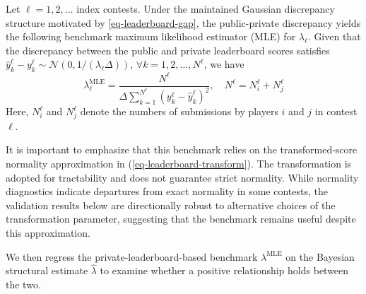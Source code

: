 \documentclass[mnsc]{informs3}
\begin{document}
Let $\ell=1,2,\ldots$ index contests.
Under the maintained Gaussian discrepancy structure motivated by \eqref{eq-leaderboard-gap}, the public-private discrepancy yields the following benchmark maximum likelihood estimator (MLE) for $\lambda_\ell$.
Given that the discrepancy between the public and private leaderboard scores satisfies $\hat{y}_k^\ell - y_k^\ell \sim \mathcal{N}(0, 1/(\lambda_\ell\Delta))$, $\forall k = 1, 2, ..., N^\ell$, we have
\begin{equation*}
\lambda^{\text{MLE}}_\ell = \frac{N^\ell}{\Delta\sum^{N^\ell}_{k=1}(y_k^\ell - \hat{y}_k^\ell)^2}, \quad N^\ell = N^\ell_i + N^\ell_j
\end{equation*}
Here, $N^\ell_i$ and $N^\ell_j$ denote the numbers of submissions by players $i$ and $j$ in contest $\ell$.

It is important to emphasize that this benchmark relies on the transformed-score normality approximation in (\ref{eq-leaderboard-transform}).
The transformation is adopted for tractability and does not guarantee strict normality. While normality diagnostics indicate departures from exact normality in some contests, the validation results below are directionally robust to alternative choices of the transformation parameter, suggesting that the benchmark remains useful despite this approximation.

We then regress the private-leaderboard-based benchmark $\lambda^{\text{MLE}}$ on the Bayesian structural estimate $\hat\lambda$ to examine whether a positive relationship holds between the two.
\end{document}
